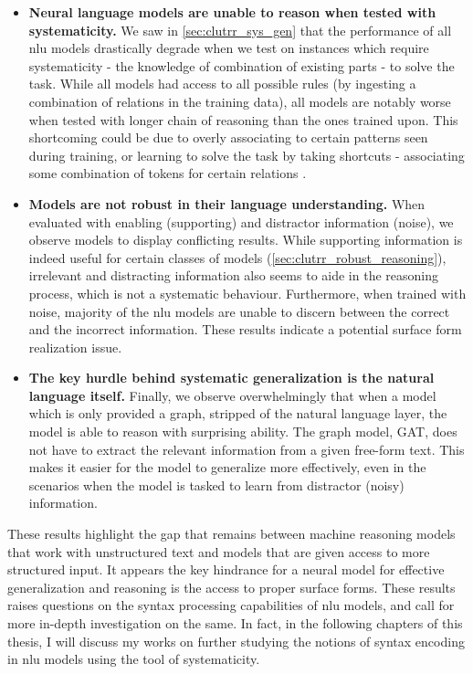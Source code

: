 \documentclass[letterpaper, 12pt]{report}
\begin{document}
\begin{itemize}
  \item \textbf{Neural language models are unable to reason when tested with systematicity.} We saw in \autoref{sec:clutrr_sys_gen} that the performance of all \acrshort{nlu} models drastically degrade when we test on instances which require systematicity - the knowledge of combination of existing parts - to solve the task. While all models had access to all possible rules (by ingesting a combination of relations in the training data), all models are notably worse when tested with longer chain of reasoning than the ones trained upon. This shortcoming could be due to overly associating to certain patterns seen during training, or learning to solve the task by taking shortcuts - associating some combination of tokens for certain relations \citep{gururangan-etal-2018-annotation}.
  \item \textbf{Models are not robust in their language understanding.} When evaluated with enabling (supporting) and distractor information (noise), we observe models to display conflicting results. While supporting information is indeed useful for certain classes of models (\autoref{sec:clutrr_robust_reasoning}), irrelevant and distracting information also seems to aide in the reasoning process, which is not a systematic behaviour. Furthermore, when trained with noise, majority of the \acrshort{nlu} models are unable to discern between the correct and the incorrect information. These results indicate a potential surface form realization issue.
  \item \textbf{The key hurdle behind systematic generalization is the natural language itself.} Finally, we observe overwhelmingly that when a model which is only provided a graph, stripped of the natural language layer, the model is able to reason with surprising ability. The graph model, GAT, does not have to extract the relevant information from a given free-form text. This makes it easier for the model to generalize more effectively, even in the scenarios when the model is tasked to learn from distractor (noisy) information.
\end{itemize}

These results highlight the gap that remains between machine reasoning models that work with unstructured text and models that are given access to more structured input. It appears the key hindrance for a neural model for effective generalization and reasoning is the access to proper surface forms. These results raises questions on the syntax processing capabilities of \acrshort{nlu} models, and call for more in-depth investigation on the same. In fact, in the following chapters of this thesis, I will discuss my works on further studying the notions of syntax encoding in \acrshort{nlu} models using the tool of systematicity.
\end{document}
